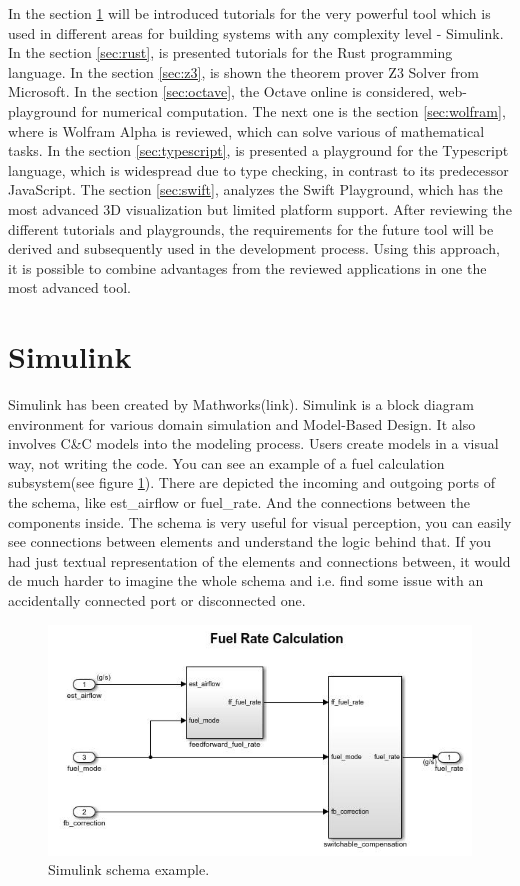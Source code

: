 In the section \ref{sec:simulink} will be introduced tutorials for the very powerful tool which is used in different areas for building systems with any complexity level - Simulink. In the section \ref{sec:rust}, is presented tutorials for the Rust programming language. In the section \ref{sec:z3}, is shown the theorem prover Z3 Solver from Microsoft. In the section \ref{sec:octave}, the Octave online is considered, web-playground for numerical computation. The next one is the section \ref{sec:wolfram}, where is Wolfram Alpha is reviewed, which can solve various of mathematical tasks. In the section \ref{sec:typescript}, is presented a playground for the Typescript language, which is widespread due to type checking, in contrast to its predecessor JavaScript. The section \ref{sec:swift}, analyzes the Swift Playground, which has the most advanced 3D visualization but limited platform support. After reviewing the different tutorials and playgrounds, the requirements for the future tool will be derived and subsequently used in the development process. Using this approach, it is possible to combine advantages from the reviewed applications in one the most advanced tool.

\section{Simulink} \label{sec:simulink}
Simulink has been created by Mathworks(link). Simulink is a block diagram environment for various domain simulation and Model-Based Design. It also involves C\&C models into the modeling process. Users create models in a visual way, not writing the code. You can see an example of a fuel calculation subsystem(see figure \ref{fig:simulink}). There are depicted the incoming and outgoing ports of the schema, like est\_airflow or fuel\_rate. And the connections between the components inside. The schema is very useful for visual perception, you can easily see connections between elements and understand the logic behind that. If you had just textual representation of the elements and connections between, it would de much harder to imagine the whole schema and i.e. find some issue with an accidentally connected port or disconnected one.

\begin{figure}[h!]
    \centering
    \includegraphics[width=0.7\linewidth]{src/pic/simulink}
    \caption{Simulink schema example.}
    \label{fig:simulink}
\end{figure}

